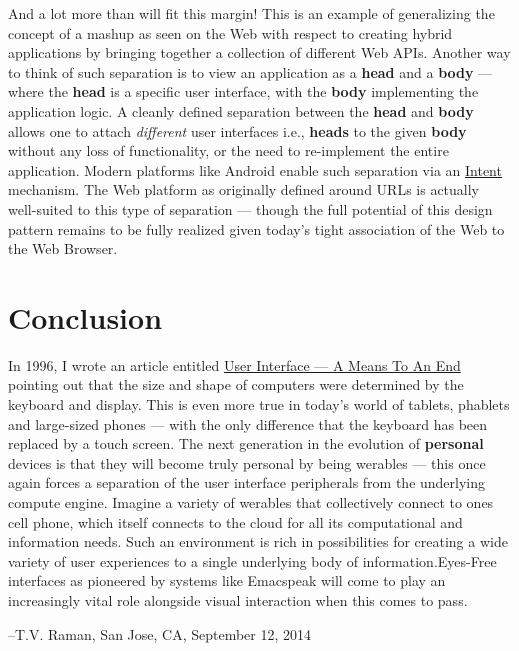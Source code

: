 \documentclass[11pt]{article}
\begin{document}
And a lot more than will fit this margin! This is an example of
generalizing the concept of a mashup as seen on the Web with
respect to creating hybrid applications by bringing together a
collection of different Web APIs. Another way to think of such
separation is to view an application as a \textbf{head} and a \textbf{body} —
where the \textbf{head} is a specific user interface, with the \textbf{body}
implementing the application logic. A cleanly defined separation
between the \textbf{head} and \textbf{body} allows one to attach \emph{different}
user interfaces i.e., \textbf{heads} to the given \textbf{body} without any
loss of functionality, or the need to re-implement the entire
application. Modern platforms like Android enable such separation
via an \href{http://developer.android.com/reference/android/content/Intent.html}{Intent} mechanism. The Web platform as originally defined
around URLs is actually well-suited to this type of separation —
though the full potential of this design pattern remains to be
fully realized given today's tight association of the Web to the
Web Browser.

\section{Conclusion}
\label{sec-16}


In 1996, I wrote an article entitled \href{http://www.drdobbs.com/user-interface-a-means-to-an-end/184410453}{User Interface — A Means To
An End} pointing out that the size and shape of computers were
determined by the keyboard and display. This is even more true in
today's world of tablets, phablets and large-sized phones — with
the only difference that the keyboard has been replaced by a
touch screen. The next generation in the evolution of \textbf{personal}
devices is that they will become truly personal by being werables
— this once again forces a separation of the user interface
peripherals from the underlying compute engine. Imagine a variety
of werables that collectively connect to ones cell phone, which
itself connects to the cloud for all its computational and
information needs. Such an environment is rich in possibilities
for  creating a wide variety of  user experiences to a single
underlying body of information.Eyes-Free interfaces as pioneered
by systems like Emacspeak will come to play an increasingly vital
role alongside  visual interaction when this comes to pass.



--T.V. Raman, San Jose, CA, September 12, 2014
\end{document}
